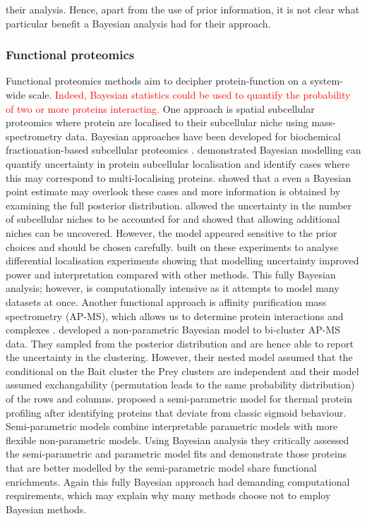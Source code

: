 \documentclass[12pt,english, journal=jpr, layout=twocolumn]{article}
\begin{document}
their analysis. Hence, apart from the use of prior information, it is not clear what particular benefit a Bayesian analysis had for their approach.

\subsubsection{Functional proteomics}       
Functional proteomics methods aim to decipher protein-function on a system-wide scale. \textcolor{red}{ Indeed, Bayesian statistics could be used to quantify the probability of two or more proteins interacting.} One approach is spatial subcellular proteomics \citep{Geladaki::2019, Christopher::2021} where protein are localised to their subcellular niche using mass-spectrometry data. Bayesian approaches have been developed for biochemical fractionation-based subcellular proteomics \citep{Crook::2018, Crook::2019, Crook::2019b, Crook::2020, Crook::2021}. \citet{Crook::2018, Crook::2019, Crook::2019b} demonstrated Bayesian modelling can quantify uncertainty in protein subcellular localisation and identify cases where this may correspond to multi-localising proteins. \citet{Crook::2018} showed that a even a Bayesian point estimate may overlook these cases and more information is obtained by examining the full posterior distribution. \citet{Crook::2020} allowed the uncertainty in the number of subcellular niches to be accounted for and showed that allowing additional niches can be uncovered. However, the model appeared sensitive to the prior choices and should be chosen carefully. \citet{Crook::2021} built on these experiments to analyse differential localisation experiments showing that modelling uncertainty improved power and interpretation compared with other methods. This fully Bayesian analysis; however, is computationally intensive as it attempts to model many datasets at once. Another functional approach is affinity purification mass spectrometry (AP-MS), which allows us to determine protein interactions and complexes \citep{Christopher::2021}. \citet{Choi::2010} developed a non-parametric Bayesian model to bi-cluster AP-MS data. They sampled from the posterior distribution and are hence able to report the uncertainty in the clustering. However, their nested model assumed that the conditional on the Bait cluster the Prey clusters are independent and their model assumed exchangability (permutation leads to the same probability distribution) of the rows and columns. \citet{Fang::2021} proposed a semi-parametric model for thermal protein profiling after identifying proteins that deviate from classic sigmoid behaviour. Semi-parametric models combine interpretable parametric models with more flexible non-parametric models. Using Bayesian analysis they critically assessed the semi-parametric and parametric model fits and demonstrate those proteins that are better modelled by the semi-parametric model share functional enrichments. Again this fully Bayesian approach had demanding computational requirements, which may explain why many methods choose not to employ Bayesian methods.
	
\end{document}
